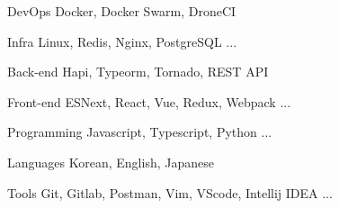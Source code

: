

\begin{cvskills}

  \cvskill
    {DevOps} %
    {Docker, Docker Swarm, DroneCI} %
    
  \cvskill
    {Infra} %
    {Linux, Redis, Nginx, PostgreSQL ...} %

  \cvskill
    {Back-end} %
    {Hapi, Typeorm, Tornado, REST API} %

  \cvskill
    {Front-end} %
    {ESNext, React, Vue, Redux, Webpack ...} %

  \cvskill
    {Programming} %
    {Javascript, Typescript, Python ...} %

  \cvskill
    {Languages} %
    {Korean, English, Japanese} %

  \cvskill
    {Tools} %
    {Git, Gitlab, Postman, Vim, VScode, Intellij IDEA ...} %

\end{cvskills}
